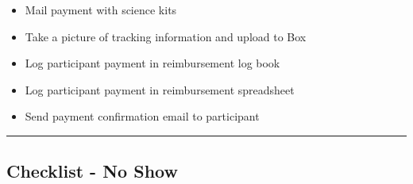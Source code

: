 \documentclass[]{book}
\providecommand{\tightlist}{%
  \setlength{\itemsep}{0pt}\setlength{\parskip}{0pt}}
\begin{document}
\begin{itemize}
\tightlist
\item
  Mail payment with science kits
\item
  Take a picture of tracking information and upload to Box
\item
  Log participant payment in reimbursement log book
\item
  Log participant payment in reimbursement spreadsheet
\item
  Send payment confirmation email to participant
\end{itemize}

\begin{center}\rule{0.5\linewidth}{0.5pt}\end{center}

\hypertarget{checklist---no-show}{%
\subsection{Checklist - No Show}\label{checklist---no-show}}
\end{document}
